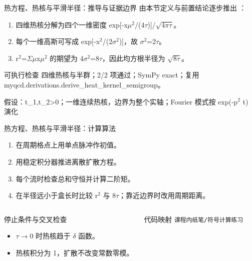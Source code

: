 \begin{frame}[t]{热方程、热核与平滑半径：推导与证据边界}
\footnotesize
{}\quad 由本节定义与前置结论逐步推出 ：
\begin{enumerate}
\item 四维热核分解为四个一维密度 exp[-x\ensuremath{\mu}\ensuremath{^{2}}/\allowbreak{}(4\ensuremath{\tau})]/\allowbreak{}\ensuremath{\sqrt{4\pi\tau}}。
\item 每个一维高斯可写成 exp[-x\ensuremath{^{2}}/\allowbreak{}(2\ensuremath{\sigma}\ensuremath{^{2}})]，故 \ensuremath{\sigma}\ensuremath{^{2}}=2\ensuremath{\tau}。
\item r\ensuremath{^{2}}=\ensuremath{\Sigma}\ensuremath{\mu}x\ensuremath{\mu}\ensuremath{^{2}} 的期望为 4\ensuremath{\sigma}\ensuremath{^{2}}=8\ensuremath{\tau}，因此均方根半径为 \ensuremath{\sqrt{8\tau}}。
\end{enumerate}\begin{block}{可执行检查}
\quad 四维热核与半群；2/2 项通过；SymPy exact；复用 myqcd.derivations.derive\_heat\_kernel\_semigroup。
\par\scriptsize 假设：t\_1,t\_2>0；一维连续热核，边界为整个实轴；Fourier 模式按 exp(-p\ensuremath{^{2}} t) 演化
\end{block}
\end{frame}

\begin{frame}[t]{热方程、热核与平滑半径：计算算法}
\footnotesize
{}\begin{enumerate}
\item 在周期格点上用单点脉冲作初值。
\item 用稳定积分器推进离散扩散方程。
\item 每个流时检查总和守恒并计算二阶矩。
\item 在半径远小于盒长时比较 r\ensuremath{^{2}} 与 8\ensuremath{\tau}；靠近边界时改用周期距离。
\end{enumerate}\begin{columns}[T,onlytextwidth]
\begin{block}{停止条件与交叉检查}\scriptsize\begin{itemize}
\item[\CheckMark] \ensuremath{\tau}\ensuremath{\rightarrow}0 时热核趋于 \ensuremath{\delta} 函数。
\item[\CheckMark] 热核积分为 1，扩散不改变常数零模。
\end{itemize}\end{block}
\begin{block}{代码映射}
\scriptsize \texttt{课程内纸笔/\allowbreak{}符号计算练习}
\end{block}\end{columns}\end{frame}

